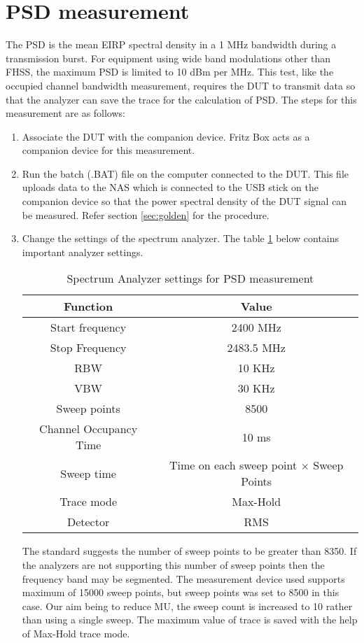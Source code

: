 \section{\acl{PSD} measurement}
\label{sec:psdmeas}
The \acl{PSD} is the mean \acf{EIRP} spectral density in a 1 MHz bandwidth during a transmission burst. For equipment using wide band modulations other than \acs{FHSS}, the maximum \acf{PSD} is limited to 10 dBm per MHz. This test, like the occupied channel bandwidth measurement, requires the \acs{DUT} to transmit data so that the analyzer can save the trace for the calculation of \acf{PSD}. The steps for this measurement are as follows:

\begin{enumerate}
  \item Associate the \acs{DUT} with the companion device. Fritz Box acts as a companion device for this measurement. 
\item Run the batch (.BAT) file on the computer connected to the \acs{DUT}. This file uploads data to the \ac{NAS} which is connected to the USB stick on the companion device so that the power spectral density of the \acs{DUT} signal can be measured. Refer section \ref{sec:golden} for the procedure.
\item Change the settings of the spectrum analyzer. The table \ref{tab:analyzerpsd} below contains important analyzer settings.
\begin{table}[H]
\begin{center}
\begin {tabular} {|c|c|} 
\toprule
Function & Value \\ 
\midrule 
Start frequency & 2400 MHz \\
Stop Frequency  & 2483.5 MHz\\
\ac{RBW} & 10 KHz \\
\ac{VBW} & 30 KHz\\
Sweep points & 8500 \\
Channel Occupancy Time & 10 ms \\
Sweep time & Time on each sweep point $\times$ Sweep Points \\
Trace mode & Max-Hold \\
Detector & \ac{RMS}\\
\bottomrule
\end{tabular} 
\caption{Spectrum Analyzer settings for \ac{PSD} measurement}
\label{tab:analyzerpsd}
\end{center}
\end{table}
The standard suggests the number of sweep points to be greater than 8350. If the analyzers are not supporting this number of sweep points then the frequency band may be segmented. The measurement device used supports maximum of 15000 sweep points, but sweep points was set to 8500 in this case. Our aim being to reduce \acf{MU}, the sweep count is increased to 10 rather than using a single sweep. The maximum value of trace is saved with the help of Max-Hold trace mode.
  

\end{enumerate}
